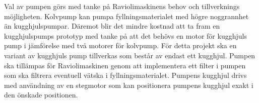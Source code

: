 Val av pumpen görs med tanke på Raviolimaskinens behov och tillverknings möjligheten. Kolvpump kan pumpa fyllningsmaterialet med högre noggrannhet än kugghjulspumpar.  Däremot blir det mindre kostnad att ta fram en kugghjulspumps prototyp med tanke på att det behövs en motor för kugghjuls pump i jämförelse med två motorer för kolvpump.
För detta projekt ska en variant av kugghjuls pump tillverkas som består av endast ett kugghjul. Pumpen ska tillämpas för Raviolimaskinen genom att implementera ett filter i pumpen som ska filtrera eventuell vätska i fyllningsmaterialet. Pumpens kugghjul drivs med användning av en stegmotor som kan positionera pumpens kugghjul exakt i den önskade positionen.
